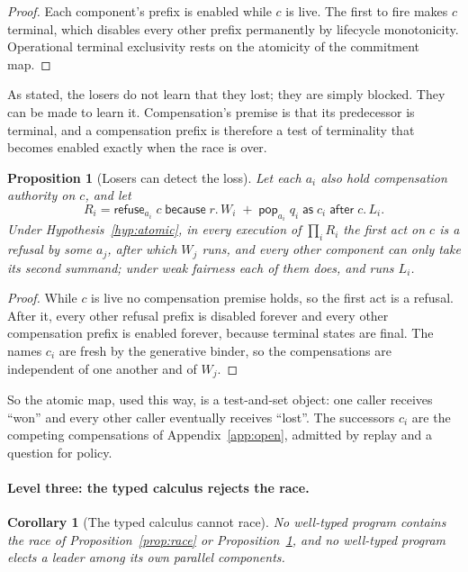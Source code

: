 \documentclass[11pt,openany]{book}
\newtheorem{proposition}[theorem]{Proposition}
\newtheorem{corollary}[theorem]{Corollary}
\theoremstyle{remark}
\begin{document}
\begin{proof}
Each component's prefix is enabled while $c$ is live. The first to fire
makes $c$ terminal, which disables every other prefix permanently by
lifecycle monotonicity. Operational terminal exclusivity rests on the
atomicity of the commitment map.
\end{proof}

As stated, the losers do not learn that they lost; they are simply
blocked. They can be made to learn it. Compensation's premise is that its
predecessor is terminal, and a compensation prefix is therefore a test of
terminality that becomes enabled exactly when the race is over.

\begin{proposition}[Losers can detect the loss]\label{prop:loser}
Let each $a_i$ also hold compensation authority on $c$, and let
\[
R_i=\mathsf{refuse}_{a_i}\;c\;\mathsf{because}\;r.\,W_i
\;+\;
\mathsf{pop}_{a_i}\;q_i\;\mathsf{as}\;c_i\;\mathsf{after}\;c.\,L_i.
\]
Under Hypothesis~\ref{hyp:atomic}, in every execution of
$\prod_i R_i$ the first act on $c$ is a refusal by some $a_j$, after which
$W_j$ runs, and every other component can only take its second summand;
under weak fairness each of them does, and runs $L_i$.
\end{proposition}

\begin{proof}
While $c$ is live no compensation premise holds, so the first act is a
refusal. After it, every other refusal prefix is disabled forever and
every other compensation prefix is enabled forever, because terminal
states are final. The names $c_i$ are fresh by the generative binder, so
the compensations are independent of one another and of $W_j$.
\end{proof}

So the atomic map, used this way, is a test-and-set object: one caller
receives ``won'' and every other caller eventually receives ``lost''. The
successors $c_i$ are the competing compensations of
Appendix~\ref{app:open}, admitted by replay and a question for policy.

\paragraph{Level three: the typed calculus rejects the race.}

\begin{corollary}[The typed calculus cannot race]\label{cor:norace}
No well-typed program contains the race of
Proposition~\ref{prop:race} or Proposition~\ref{prop:loser}, and no
well-typed program elects a leader among its own parallel components.
\end{corollary}
\end{document}

